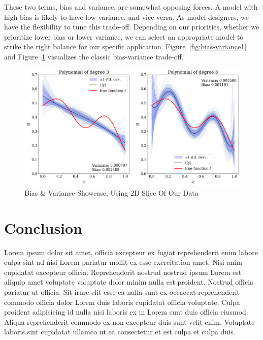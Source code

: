 \documentclass[twoside,11pt]{report}
\begin{document}
These two terms, bias and variance, are somewhat opposing forces. A model with high bias is likely to 
have low variance, and vice versa. As model designers, we have the flexibility to tune this trade-off. 
Depending on our priorities, whether we prioritize lower bias or lower variance, we can select an appropriate 
model to strike the right balance for our specific application.
Figure~\ref{fig:bias-variance1} and Figure~\ref{fig:bias-variance2} visualizes the classic bias-variance trade-off.
\begin{figure}[!h]
    \begin{center}
        \includegraphics[width=1.0\textwidth]{../runsAndAdditions/bias-variance2.png}
    \end{center}
    \caption{Bias \& Variance Showcase, Using 2D Slice Of Our Data}\label{fig:bias-variance2}
\end{figure}








\section{Conclusion}
\label{sec:conclusion}


Lorem ipsum dolor sit amet, officia excepteur ex fugiat reprehenderit enim labore 
culpa sint ad nisi Lorem pariatur mollit ex esse exercitation amet. Nisi anim cupidatat 
excepteur officia. Reprehenderit nostrud nostrud ipsum Lorem est aliquip amet voluptate 
voluptate dolor minim nulla est proident. Nostrud officia pariatur ut officia. Sit irure 
elit esse ea nulla sunt ex occaecat reprehenderit commodo officia dolor Lorem duis laboris
cupidatat officia voluptate. Culpa proident adipisicing id nulla nisi laboris ex in Lorem 
sunt duis officia eiusmod. Aliqua reprehenderit commodo ex non excepteur duis sunt velit enim. 
Voluptate laboris sint cupidatat ullamco ut ea consectetur et est culpa et culpa duis.
\end{document}
